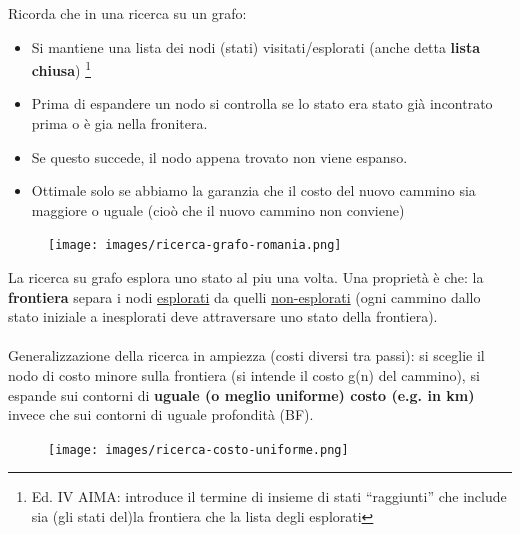 \begin{note}
	Ricorda che in una ricerca su un grafo:
	\begin{itemize}
		\item Si mantiene una lista dei nodi (stati) visitati/esplorati (anche detta \textbf{lista chiusa}) \footnote{Ed. IV AIMA: introduce il termine di insieme di stati “raggiunti”
		che include sia (gli stati del)la frontiera che la lista degli esplorati}
		\item Prima di espandere un nodo si controlla se lo stato era stato già incontrato prima o è gia nella fronitera.
		\item Se questo succede, il nodo appena trovato non viene espanso.
		\item Ottimale solo se abbiamo la garanzia che il costo del nuovo cammino sia maggiore o uguale (cioò che il nuovo cammino non conviene)
	\end{itemize}
\end{note}
\begin{figure}[h!]
	\centering
	\texttt{[image: images/ricerca-grafo-romania.png]}
\end{figure}
\hspace{-15pt}La ricerca su grafo esplora uno stato al piu una volta. Una proprietà è che:
la \textbf{frontiera} separa i nodi \underline{esplorati} da quelli \underline{non-esplorati} (ogni cammino dallo
stato iniziale a inesplorati deve attraversare uno stato della frontiera).\\\\
Generalizzazione della ricerca in ampiezza (costi diversi tra passi): si sceglie il
nodo di costo minore sulla frontiera (si intende il costo g(n) del cammino), si
espande sui contorni di \textbf{uguale (o meglio uniforme) costo (e.g. in km)} invece
che sui contorni di uguale profondità (BF).
\begin{figure}[h!]
	\centering
	\texttt{[image: images/ricerca-costo-uniforme.png]}
\end{figure}

